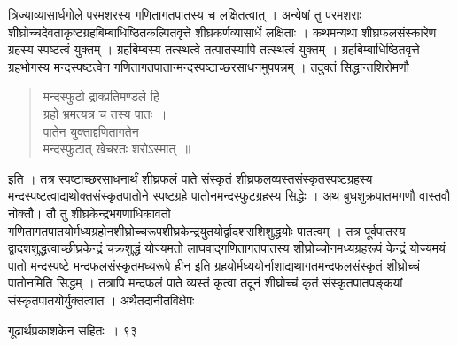 \documentclass[11pt, openany]{book}
\begin{document}
\begin{sloppypar}
\noindent त्रिज्याव्यासार्धगोले परमशरस्य गणितागतपातस्य च लक्षितत्वात् । अन्येषां तु परमशराः शीघ्रोच्चदेवताकृष्टग्रहबिम्बाधिष्ठितकल्पितवृत्ते शीघ्रकर्णव्यासार्धे लक्षिताः । कथमन्यथा शीघ्रफलसंस्कारेण ग्रहस्य स्पष्टत्वं युक्तम् । ग्रहबिम्बस्य तत्स्थत्वे तत्पातस्यापि तत्स्थत्वं युक्तम् । ग्रहबिम्बाधिष्ठितवृत्ते ग्रहभोगस्य मन्दस्पष्टत्वेन गणितागतपातान्मन्दस्पष्टाच्छरसाधनमुपपन्नम् । तदुक्तं सिद्धान्तशिरोमणौ\textendash
\end{sloppypar}
\begin{quote}

{\qt मन्दस्फुटो द्राक्प्रतिमण्डले हि\\
ग्रहो भ्रमत्यत्र च तस्य पातः~।\\
पातेन युक्ताद्दणितागतेन\\
मन्दस्फुटात् खेचरतः शरोऽस्मात्~॥}
\end{quote}
\begin{sloppypar}
इति । तत्र स्पष्टाच्छरसाधनार्थं शीघ्रफलं पाते संस्कृतं शीघ्रफलव्यस्तसंस्कृतस्पष्टग्रहस्य मन्दस्पष्टत्वाद्यथोक्तसंस्कृतपातोने स्पष्टग्रहे पातोनमन्दस्फुटग्रहस्य सिद्धेः । अथ बुधशुक्रपातभगणौ वास्तवौ नोक्तौ। तौ तु शीघ्रकेन्द्रभगणाधिकावतो गणितागतपातयोर्मध्यग्रहोनशीघ्रोच्चरूपशीघ्रकेन्द्रयुतयोर्द्वादशराशिशुद्धयोः पातत्वम् । तत्र पूर्वपातस्य द्वादशशुद्धत्वाच्छीघ्रकेन्द्रं चक्रशुद्धं योज्यमतो लाघवाद्गणितागतपातस्य शीघ्रोच्चोनमध्यग्रहरूपं केन्द्रं योज्यमयं पातो मन्दस्पष्टे मन्दफलसंस्कृतमध्यरूपे हीन इति ग्रहयोर्मध्ययोर्नाशाद्यथागतमन्दफलसंस्कृतं शीघ्रोच्चं पातोनमिति सिद्धम् । तत्रापि मन्दफलं पाते व्यस्तं कृत्वा तदूनं शीघ्रोच्चं कृतं संस्कृतपातपङ्कयां संस्कृतपातयोर्युक्तत्वात । अथैतदानीतविक्षेपः
\end{sloppypar}


\newpage


\hspace{3cm}गूढार्थप्रकाशकेन सहितः~। \hfill ९३
\vspace{1cm}
\end{document}

